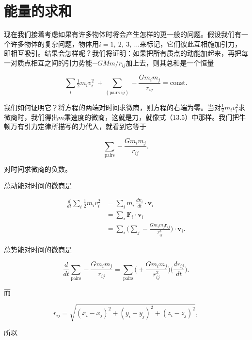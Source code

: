 \documentclass[12pt,oneside]{book}
\providecommand{\ddt}[2]{\frac{d#1}{d#2}}
\providecommand{\FLPvec}[1]{\boldsymbol{#1}}
\providecommand{\FLPF}[0]{\FLPvec{F}}
\providecommand{\FLPr}[0]{\FLPvec{r}}
\providecommand{\FLPv}[0]{\FLPvec{v}}
\begin{document}
\section{能量的求和}
现在我们接着考虑如果有许多物体时将会产生怎样的更一般的问题。假设我们有一个许多物体的复杂问题，物体用$ i=1,\ 2, \ 3, \ ... $来标记，它们彼此互相施加引力，即相互吸引。结果会怎样呢？我们将证明：如果把所有质点的动能加起来，再把每一对质点相互之间的引力势能$ -GMm/r_{ij} $加上去，则其总和是一个恒量

\begin{equation}
\label{Eq:I:13:14}
\sum_i\tfrac{1}{2}m_iv_i^2\;+\!\!\sum_{(\text{pairs $ij$})}
\!\!-\frac{Gm_im_j}{r_{ij}}=\text{const}.
\end{equation}

我们如何证明它？将方程的两端对时间求微商，则方程的右端为零。当对$ \tfrac{1}{2}m_iv_i^2 $求微商时，我们得出$ m $乘速度的微商，这就是力，就像式（13.5）中那样。我们把牛顿万有引力定律所描写的力代入，就看到它等于

\begin{equation*}
\sum_{\text{pairs}}
-\frac{Gm_im_j}{r_{ij}}.
\end{equation*}

对时间求微商的负数。

总动能对时间的微商是

\begin{equation}
\begin{aligned}
\ddt{}{t}\sum_i\tfrac{1}{2}m_iv_i^2
&=\sum_im_i\,\ddt{\FLPv_i}{t}\cdot\FLPv_i\\[.5ex]
&=\sum_i\FLPF_i\cdot\FLPv_i\\[-.5ex]
&=\sum_i\Biggl(
\sum_j-\frac{Gm_im_j\FLPr_{ij}}{r_{ij}^3}
\Biggr)\cdot\FLPv_i.
\end{aligned}
\label{Eq:I:13:15}
\end{equation}


总势能对时间的微商是

\begin{equation*}
\ddt{}{t}\sum_{\text{pairs}}
-\frac{Gm_im_j}{r_{ij}}=
\sum_{\text{pairs}}
\Biggl(+\frac{Gm_im_j}{r_{ij}^2}\Biggr)
\biggl(\ddt{r_{ij}}{t}\biggr).
\end{equation*}

而

\begin{equation*}
r_{ij}=\sqrt{(x_i-x_j)^2+(y_i-y_j)^2+(z_i-z_j)^2},
\end{equation*}


所以
\end{document}
